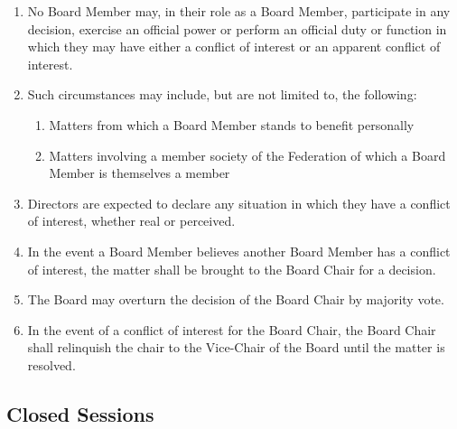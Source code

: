 \begin{enumerate}
 \item
  No Board Member may, in their role as a Board Member, participate in any decision, exercise an official power or perform an official duty or function in which they may have either a conflict of interest or an apparent conflict of interest.
 \item
  Such circumstances may include, but are not limited to, the following:

  \begin{enumerate}
   \item
    Matters from which a Board Member stands to benefit personally
   \item
    Matters involving a member society of the Federation of which a Board Member is themselves a member
  \end{enumerate}

 \item
  Directors are expected to declare any situation in which they have a conflict of interest, whether real or perceived.
 \item
  In the event a Board Member believes another Board Member has a conflict of interest, the matter shall be brought to the Board Chair for a decision.
 \item
  The Board may overturn the decision of the Board Chair by majority vote.
 \item
  In the event of a conflict of interest for the Board Chair, the Board Chair shall relinquish the chair to the Vice-Chair of the Board until the matter is resolved.
\end{enumerate}

\subsection{Closed Sessions}
\label{closed-sessions}

